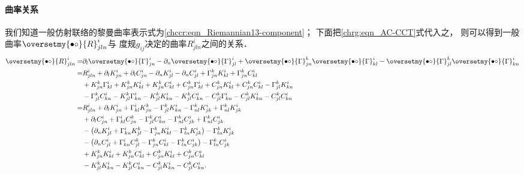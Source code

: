 \paragraph{曲率关系}
我们知道一般仿射联络的黎曼曲率表示式为\eqref{chccr:eqn_Riemannian13-component}；
下面把\eqref{chrg:eqn_AC-CCT}式代入之，
则可以得到一般曲率$\oversetmy{\bullet\circ}{R}_{jln}^i$与
度规$g_{ij}$决定的曲率${R}_{jln}^i$之间的关系．
\begin{align*}
	\oversetmy{\bullet\circ}{R}_{jln}^i 
	=& {\partial_l} \oversetmy{\bullet\circ}{\Gamma}_{jn}^{i} 
	-\partial_n \oversetmy{\bullet\circ}{\Gamma}_{jl}^{i}
	+\oversetmy{\bullet\circ}{\Gamma}_{jn}^{k} \oversetmy{\bullet\circ}{\Gamma}_{kl}^{i}
	-\oversetmy{\bullet\circ}{\Gamma}_{jl}^{k} \oversetmy{\bullet\circ}{\Gamma}_{kn}^{i}  \\
	=& {R}_{jln}^i + \partial_l K_{jn}^{i} + \partial_l C_{jn}^{i} 
	-\partial_n  K_{jl}^{i} -\partial_n C_{jl}^{i}  
	+ \Gamma_{jn}^{k} K_{kl}^{i} + \Gamma_{jn}^{k} C_{kl}^{i}  \\
	&+ K_{jn}^{k} \Gamma_{kl}^{i} + K_{jn}^{k} K_{kl}^{i}  
	+ K_{jn}^{k} C_{kl}^{i} + C_{jn}^{k} \Gamma_{kl}^{i} 
	+ C_{jn}^{k} K_{kl}^{i} + C_{jn}^{k} C_{kl}^{i}   -\Gamma_{jl}^{k} K_{kn}^{i}  \\
	&-\Gamma_{jl}^{k}C_{kn}^{i} -K_{jl}^{k}\Gamma_{kn}^{i} -K_{jl}^{k} K_{kn}^{i}  
	-K_{jl}^{k}C_{kn}^{i} -C_{jl}^{k}\Gamma_{kn}^{i}
	-C_{jl}^{k}K_{kn}^{i}-C_{jl}^{k}C_{kn}^{i} \\
	=& {R}_{jln}^i 
	+ \partial_l K_{jn}^{i} + \Gamma_{kl}^{i} K_{jn}^{k} -\Gamma_{jl}^{k} K_{kn}^{i}
	-\Gamma_{nl}^{k} K_{jk}^{i} +\Gamma_{nl}^{k} K_{jk}^{i}\\
	&+\partial_l C_{jn}^{i} + \Gamma_{kl}^{i} C_{jn}^{k} -\Gamma_{jl}^{k} C_{kn}^{i}
	-\Gamma_{nl}^{k} C_{jk}^{i} +\Gamma_{nl}^{k} C_{jk}^{i}\\
	&-\left(\partial_n K_{jl}^{i} + \Gamma_{kn}^{i} K_{jl}^{k} - \Gamma_{jn}^{k} K_{kl}^{i} 
	- \Gamma_{ln}^{k} K_{jk}^{i}  \right) - \Gamma_{ln}^{k} K_{jk}^{i} \\
	&-\left(\partial_n C_{jl}^{i} + \Gamma_{kn}^{i} C_{jl}^{k} - \Gamma_{jn}^{k} C_{kl}^{i} 
	- \Gamma_{ln}^{k} C_{jk}^{i}   \right) - \Gamma_{ln}^{k} C_{jk}^{i} \\	  
	&+ K_{jn}^{k} K_{kl}^{i}  + K_{jn}^{k} C_{kl}^{i} 
	+ C_{jn}^{k} K_{kl}^{i} + C_{jn}^{k} C_{kl}^{i}     \\
	& -K_{jl}^{k} K_{kn}^{i} -K_{jl}^{k}C_{kn}^{i} 
	-C_{jl}^{k}K_{kn}^{i}-C_{jl}^{k}C_{kn}^{i} .
\end{align*}
